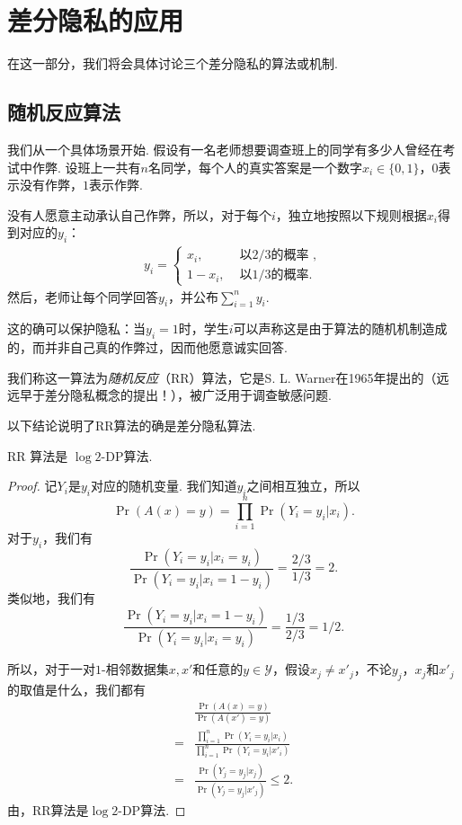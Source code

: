 \section{差分隐私的应用}
在这一部分，我们将会具体讨论三个差分隐私的算法或机制. 

\subsection{随机反应算法}
我们从一个具体场景开始. 假设有一名老师想要调查班上的同学有多少人曾经在考试中作弊. 设班上一共有$n$名同学，每个人的真实答案是一个数字$x_i \in \{0,1\}$，$0$表示没有作弊，$1$表示作弊. 

没有人愿意主动承认自己作弊，所以，对于每个$i$，独立地按照以下规则根据$x_i$得到对应的$y_i$：
\[\begin{aligned}
    y_i =
    \begin{cases}
        x_i, & \text{ 以$2/3$的概率 }, \\
        1 - x_i,& \text{ 以$1/3$的概率}.
    \end{cases}
\end{aligned}\]
然后，老师让每个同学回答$y_i$，并公布$\sum_{i=1}^n y_i$. 

这的确可以保护隐私：当$y_i = 1$时，学生$i$可以声称这是由于算法的随机机制造成的，而并非自己真的作弊过，因而他愿意诚实回答. 

我们称这一算法为\emph{随机反应}（RR）算法，它是S. L. Warner在1965年提出的（远远早于差分隐私概念的提出！），被广泛用于调查敏感问题.

以下结论说明了RR算法的确是差分隐私算法.

\begin{theorem}
    RR 算法是 $\log 2$-DP算法.
\end{theorem}
\begin{proof}
记$Y_i$是$y_i$对应的随机变量. 我们知道$y_i$之间相互独立，所以
    \[
    \Pr(A(x) = y) = \prod_{i=1}^n \Pr(Y_i = y_i  | x_i).
    \]
对于$y_i$，我们有
    \[
    \frac{\Pr(Y_i = y_i  | x_i = y_i)}{\Pr(Y_i = y_i  | x_i = 1 - y_i)} = \frac{2/3}{1/3} = 2.
    \]
类似地，我们有
    \[
    \frac{\Pr(Y_i = y_i  | x_i = 1 - y_i)}{\Pr(Y_i = y_i  | x_i = y_i)} = \frac{1/3}{2/3} = 1/2.
    \]

所以，对于一对$1$-相邻数据集$x, x'$和任意的$y \in \mathcal Y$，假设$x_j \neq x'_j$，不论$y_j$，$x_j$和$x'_j$的取值是什么，我们都有
    \begin{align*}
    & \frac{\Pr(A(x) = y)}{\Pr(A(x') = y)} \\
    =& \frac{\prod_{i=1}^n \Pr(Y_i = y_i  | x_i)}{\prod_{i=1}^n \Pr(Y_i = y_i  | x'_i)} \\
    =& \frac{\Pr(Y_j = y_j  | x_j)}{\Pr(Y_j = y_j  | x'_j)}\leq 2.
    \end{align*}
由，RR算法是$\log 2$-DP算法.
\end{proof}

